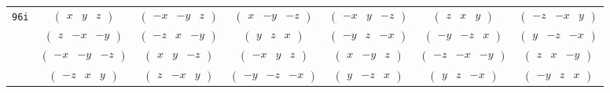 \documentclass[fleqn,9pt,landscape]{jsarticle}
\begin{document}
\begin{center}
\begin{longtable}{ccccccc}
{\tt 96i} & $ \begin{pmatrix} x & y & z \end{pmatrix} $ & $ \begin{pmatrix} - x & - y & z \end{pmatrix} $ & $ \begin{pmatrix} x & - y & - z \end{pmatrix} $ & $ \begin{pmatrix} - x & y & - z \end{pmatrix} $ & $ \begin{pmatrix} z & x & y \end{pmatrix} $ & $ \begin{pmatrix} - z & - x & y \end{pmatrix} $ \\
& $ \begin{pmatrix} z & - x & - y \end{pmatrix} $ & $ \begin{pmatrix} - z & x & - y \end{pmatrix} $ & $ \begin{pmatrix} y & z & x \end{pmatrix} $ & $ \begin{pmatrix} - y & z & - x \end{pmatrix} $ & $ \begin{pmatrix} - y & - z & x \end{pmatrix} $ & $ \begin{pmatrix} y & - z & - x \end{pmatrix} $ \\
& $ \begin{pmatrix} - x & - y & - z \end{pmatrix} $ & $ \begin{pmatrix} x & y & - z \end{pmatrix} $ & $ \begin{pmatrix} - x & y & z \end{pmatrix} $ & $ \begin{pmatrix} x & - y & z \end{pmatrix} $ & $ \begin{pmatrix} - z & - x & - y \end{pmatrix} $ & $ \begin{pmatrix} z & x & - y \end{pmatrix} $ \\
& $ \begin{pmatrix} - z & x & y \end{pmatrix} $ & $ \begin{pmatrix} z & - x & y \end{pmatrix} $ & $ \begin{pmatrix} - y & - z & - x \end{pmatrix} $ & $ \begin{pmatrix} y & - z & x \end{pmatrix} $ & $ \begin{pmatrix} y & z & - x \end{pmatrix} $ & $ \begin{pmatrix} - y & z & x \end{pmatrix} $ \\

\end{longtable}
\end{center}
\end{document}
